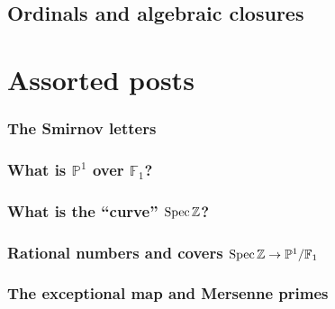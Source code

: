 \documentclass[a4paper]{memoir}
\begin{document}
\chapter{Ordinals and algebraic closures}




\part{Assorted posts}

\setcounter{section}{0}
\renewcommand\leftmark{ASSORTED POSTS}
\renewcommand\thesection{\Alph{section}}

\section{The Smirnov letters}

\let\stdsection\section  
\renewcommand\section{\newpage\stdsection} 

\section{What is \texorpdfstring{$\mathbb{P}^1$}{the projective line} over \texorpdfstring{$\mathbb{F}_1$}{F\_un}?}


\section{What is the ``curve'' \texorpdfstring{$\operatorname{Spec}\mathbb{Z}$}{Spec Z}?}


\section{Rational numbers and covers \texorpdfstring{$\operatorname{Spec}\mathbb{Z}\to\mathbb{P}^1/\mathbb{F}_1$}{}}


\section{The exceptional map and Mersenne primes}

\end{document}
